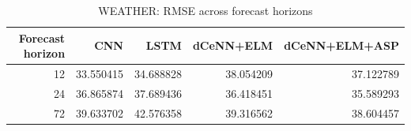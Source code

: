 \begin{table}
\caption{WEATHER: RMSE across forecast horizons}
\begin{tabular}{rrrrr}
\toprule
Forecast horizon & CNN & LSTM & dCeNN+ELM & dCeNN+ELM+ASP \\
\midrule
12 & 33.550415 & 34.688828 & 38.054209 & 37.122789 \\
24 & 36.865874 & 37.689436 & 36.418451 & 35.589293 \\
72 & 39.633702 & 42.576358 & 39.316562 & 38.604457 \\
\bottomrule
\end{tabular}
\end{table}
